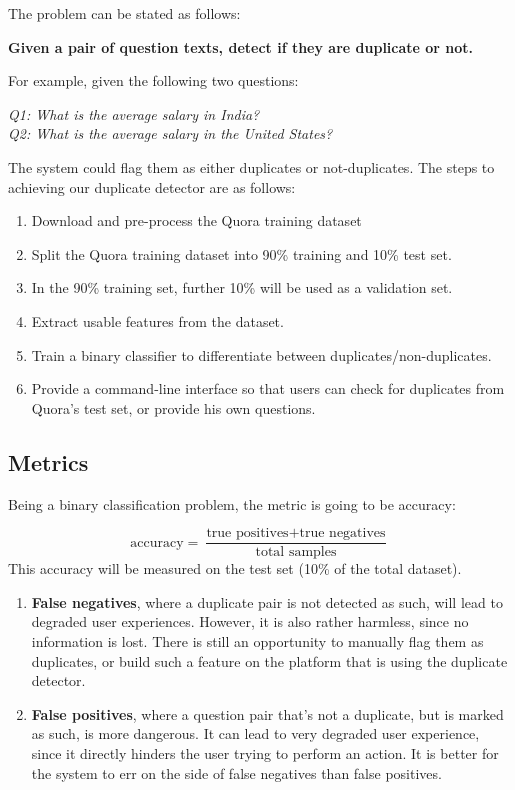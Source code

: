 \documentclass{article}
\begin{document}
The problem can be stated as follows:

\begin{center}
\textbf{Given a pair of question texts, detect if they are duplicate or not.}
\end{center}
For example, given the following two questions:

\begin{center}
\textit{Q1: What is the average salary in India?}\\
\textit{Q2: What is the average salary in the United States?}
\end{center}
The system could flag them as either duplicates or not-duplicates. The steps to achieving our duplicate detector are as follows:

\begin{enumerate}
\item{Download and pre-process the Quora training dataset}
\item{Split the Quora training dataset into 90\% training and 10\% test set.}
\item{In the 90\% training set, further 10\% will be used as a validation set.}
\item{Extract usable features from the dataset.}
\item{Train a binary classifier to differentiate between duplicates/non-duplicates.}
\item{Provide a command-line interface so that users can check for duplicates from Quora's test set, or provide his own questions.}
\end{enumerate}

\subsection{Metrics}

Being a binary classification problem, the metric is going to be accuracy:

$$\text{accuracy} = \frac{\text{true positives} + \text{true negatives}}{\text{total samples}}$$
This accuracy will be measured on the test set (10\% of the total dataset).

\begin{enumerate}
\item{\textbf{False negatives}, where a duplicate pair is not detected as such, will lead to degraded user experiences. However, it is also rather harmless, since no information is lost. There is still an opportunity to manually flag them as duplicates, or build such a feature on the platform that is using the duplicate detector.}
\item{\textbf{False positives}, where a question pair that's not a duplicate, but is marked as such, is more dangerous. It can lead to very degraded user experience, since it directly hinders the user trying to perform an action. It is better for the system to err on the side of false negatives than false positives.}
\end{enumerate}
\end{document}
